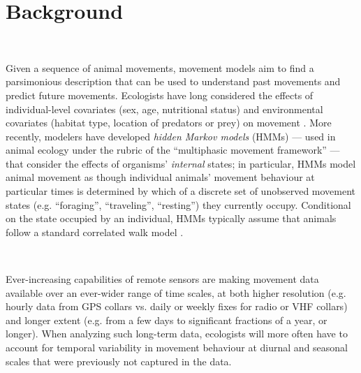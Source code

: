 \documentclass{bmcart}
\begin{document}

\section*{Background}

\

Given a sequence of animal movements, movement models aim to find a parsimonious description
that can be used to understand past movements and predict
future movements. Ecologists have long considered the effects of
individual-level covariates (sex, age, nutritional status) and
environmental covariates (habitat type, location of predators or prey)
on movement \cite{patterson2008state, mckenzie2009first, pal1998dispersal}. 
More recently, modelers have developed
\emph{hidden Markov models} (HMMs)
\cite{firle_influence_1998,nathan_movement_2008,langrock_flexible_2012} %
--- used in animal ecology under the rubric of the ``multiphasic movement
framework'' \cite{fryxell_multiple_2008} --- that consider the effects
of organisms' \emph{internal} states; in particular, HMMs model animal
movement as though individual animals' movement behaviour 
at particular times is determined
by which of a discrete set of unobserved movement states
(e.g. ``foraging'', ``traveling'', ``resting'') they currently occupy.
Conditional on the state occupied by an individual, HMMs typically
assume that animals follow a standard correlated walk model
\cite{okubo_diffusion_1980,turchin1998quantitative}.

\

Ever-increasing capabilities of remote
sensors are making movement data available over an
ever-wider range of time scales, at both higher resolution (e.g. hourly data
from GPS collars vs. daily or weekly fixes for radio or VHF
collars) and longer extent (e.g. from a few days to significant
fractions of a year, or longer).  When analyzing such
long-term data, ecologists will more
often have to account for temporal variability in movement
behaviour at diurnal and seasonal scales that were previously
not captured in the data.

\
\end{document}
